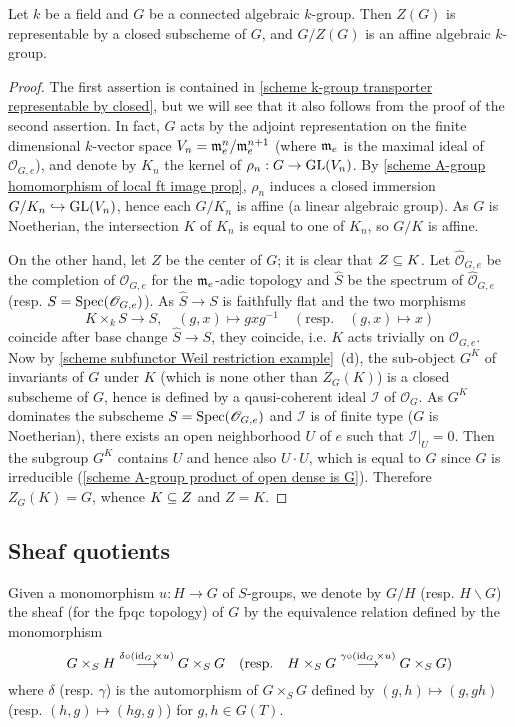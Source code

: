 \begin{corollary}\label{scheme alg group center is closed and quotient affine}
Let $k$ be a field and $G$ be a connected algebraic $k$-group. Then $Z(G)$ is representable by a closed subscheme of $G$, and $G/Z(G)$ is an affine algebraic $k$-group. 
\end{corollary}
\begin{proof}
The first assertion is contained in \cref{scheme k-group transporter representable by closed}, but we will see that it also follows from the proof of the second assertion. In fact, $G$ acts by the adjoint representation on the finite dimensional $k$-vector space $V_n=\mathfrak{m}_e^n/\mathfrak{m}_e^{n+1}$ (where $\mathfrak{m}_e$ is the maximal ideal of $\mathscr{O}_{G,e}$), and denote by $K_n$ the kernel of $\rho_n:G\to\mathrm{GL}(V_n)$. By \cref{scheme A-group homomorphism of local ft image prop}, $\rho_n$ induces a closed immersion $G/K_n\hookrightarrow\mathrm{GL}(V_n)$, hence each $G/K_n$ is affine (a linear algebraic group). As $G$ is Noetherian, the intersection $K$ of $K_n$ is equal to one of $K_n$, so $G/K$ is affine.\par
On the other hand, let $Z$ be the center of $G$; it is clear that $Z\subseteq K$. Let $\widehat{\mathscr{O}}_{G,e}$ be the completion of $\mathscr{O}_{G,e}$ for the $\mathfrak{m}_e$-adic topology and $\widehat{S}$ be the spectrum of $\widehat{\mathscr{O}}_{G,e}$ (resp. $S=\mathrm{Spec}(\mathscr{O}_{G,e})$). As $\widehat{S}\to S$ is faithfully flat and the two morphisms
\[K\times_kS\to S,\quad (g,x)\mapsto gxg^{-1}\quad (\text{resp.}\quad (g,x)\mapsto x)\]
coincide after base change $\widehat{S}\to S$, they coincide, i.e. $K$ acts trivially on $\mathscr{O}_{G,e}$. Now by \cref{scheme subfunctor Weil restriction example}~(d), the sub-object $G^K$ of invariants of $G$ under $K$ (which is none other than $Z_G(K)$) is a closed subscheme of $G$, hence is defined by a qausi-coherent ideal $\mathscr{I}$ of $\mathscr{O}_G$. As $G^K$ dominates the subscheme $S=\mathrm{Spec}(\mathscr{O}_{G,e})$ and $\mathscr{I}$ is of finite type ($G$ is Noetherian), there exists an open neighborhood $U$ of $e$ such that $\mathscr{I}|_U=0$. Then the subgroup $G^K$ contains $U$ and hence also $U\cdot U$, which is equal to $G$ since $G$ is irreducible (\cref{scheme A-group product of open dense is G}). Therefore $Z_G(K)=G$, whence $K\subseteq Z$ and $Z=K$.
\end{proof}

\subsection{Sheaf quotients}
\begin{definition}
Given a monomorphism $u:H\to G$ of $S$-groups, we denote by $G/H$ (resp. $H\backslash G$) the sheaf (for the fpqc topology) of $G$ by the equivalence relation defined by the monomorphism
\[G\times_SH\stackrel{\delta\circ(\operatorname{id}_G\times u)}{\longrightarrow} G\times_SG\quad (\text{resp.}\quad H\times_SG\stackrel{\gamma\circ(\operatorname{id}_G\times u)}{\longrightarrow} G\times_SG)\]
where $\delta$ (resp. $\gamma$) is the automorphism of $G\times_SG$ defined by $(g,h)\mapsto(g,gh)$ (resp. $(h,g)\mapsto(hg,g)$) for $g,h\in G(T)$.
\end{definition}

